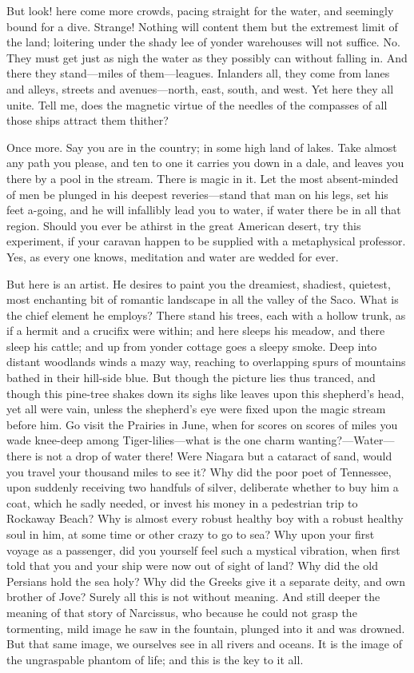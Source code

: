 \documentclass[12pt,ebook,oneside,openany]{memoir} %
\begin{document}
But look! here come more crowds, pacing straight for the water, and seemingly bound for a dive. Strange! Nothing will content them but the extremest limit of the land; loitering under the shady lee of yonder warehouses will not suffice. No. They must get just as nigh the water as they possibly can without falling in. And there they stand—miles of them—leagues. Inlanders all, they come from lanes and alleys, streets and avenues—north, east, south, and west. Yet here they all unite. Tell me, does the magnetic virtue of the needles of the compasses of all those ships attract them thither?

Once more. Say you are in the country; in some high land of lakes. Take almost any path you please, and ten to one it carries you down in a dale, and leaves you there by a pool in the stream. There is magic in it. Let the most absent-minded of men be plunged in his deepest reveries—stand that man on his legs, set his feet a-going, and he will infallibly lead you to water, if water there be in all that region. Should you ever be athirst in the great American desert, try this experiment, if your caravan happen to be supplied with a metaphysical professor. Yes, as every one knows, meditation and water are wedded for ever.

But here is an artist. He desires to paint you the dreamiest, shadiest, quietest, most enchanting bit of romantic landscape in all the valley of the Saco. What is the chief element he employs? There stand his trees, each with a hollow trunk, as if a hermit and a crucifix were within; and here sleeps his meadow, and there sleep his cattle; and up from yonder cottage goes a sleepy smoke. Deep into distant woodlands winds a mazy way, reaching to overlapping spurs of mountains bathed in their hill-side blue. But though the picture lies thus tranced, and though this pine-tree shakes down its sighs like leaves upon this shepherd’s head, yet all were vain, unless the shepherd’s eye were fixed upon the magic stream before him. Go visit the Prairies in June, when for scores on scores of miles you wade knee-deep among Tiger-lilies—what is the one charm wanting?—Water—there is not a drop of water there! Were Niagara but a cataract of sand, would you travel your thousand miles to see it? Why did the poor poet of Tennessee, upon suddenly receiving two handfuls of silver, deliberate whether to buy him a coat, which he sadly needed, or invest his money in a pedestrian trip to Rockaway Beach? Why is almost every robust healthy boy with a robust healthy soul in him, at some time or other crazy to go to sea? Why upon your first voyage as a passenger, did you yourself feel such a mystical vibration, when first told that you and your ship were now out of sight of land? Why did the old Persians hold the sea holy? Why did the Greeks give it a separate deity, and own brother of Jove? Surely all this is not without meaning. And still deeper the meaning of that story of Narcissus, who because he could not grasp the tormenting, mild image he saw in the fountain, plunged into it and was drowned. But that same image, we ourselves see in all rivers and oceans. It is the image of the ungraspable phantom of life; and this is the key to it all.
\end{document}
